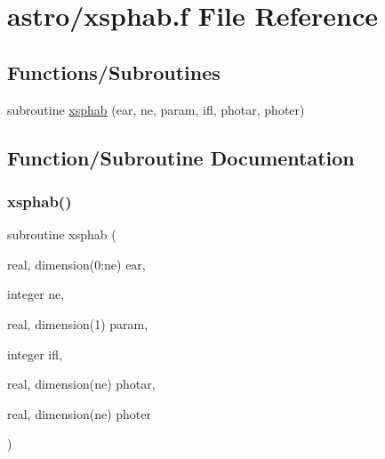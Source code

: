 \hypertarget{xsphab_8f}{}\section{astro/xsphab.f File Reference}
\label{xsphab_8f}
\subsection*{Functions/\+Subroutines}
\begin{DoxyCompactItemize}
\item 
subroutine \hyperlink{xsphab_8f_a74c7782e9272b0adcf4ef714838fcb5c}{xsphab} (ear, ne, param, ifl, photar, photer)
\end{DoxyCompactItemize}


\subsection{Function/\+Subroutine Documentation}
\mbox{\label{xsphab_8f_a74c7782e9272b0adcf4ef714838fcb5c}} 
\subsubsection{\texorpdfstring{xsphab()}{xsphab()}}
{\footnotesize\ttfamily subroutine xsphab (\begin{DoxyParamCaption}\item[{real, dimension(0\+:ne)}]{ear,  }\item[{integer}]{ne,  }\item[{real, dimension(1)}]{param,  }\item[{integer}]{ifl,  }\item[{real, dimension(ne)}]{photar,  }\item[{real, dimension(ne)}]{photer }\end{DoxyParamCaption})}

